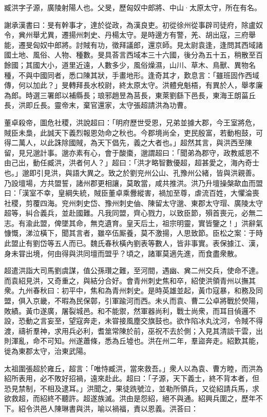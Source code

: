 
\begin{pinyinscope}
臧洪字子源，廣陵射陽人也。父旻，歷匈奴中郎將、中山·太原太守，所在有名。

謝承漢書曰：旻有幹事才，達於從政，為漢良吏。初從徐州從事辟司徒府，除盧奴令，兾州舉尤異，遷揚州刺史、丹楊太守。是時邊方有警，羌、胡出寇，三府舉能，遷旻匈奴中郎將。討賊有功，徵拜議郎，還京師。見太尉袁逢，逢問其西域諸國土地、風俗、人物、種數。旻具荅言西域本三十六國，後分為五十五，稍散至百餘國；其國大小，道里近遠，人數多少，風俗燥濕，山川、草木、鳥獸、異物名種，不與中國同者，悉口陳其狀，手畫地形。逢奇其才，歎息言：「雖班固作西域傳，何以加此？」旻轉拜長水校尉，終太原太守。洪體皃魁梧，有異於人，舉孝廉為郎。時選三署郎以補縣長；琅邪趙昱為莒長，東萊劉繇下邑長，東海王朗菑丘長，洪即丘長。靈帝末，棄官還家，太守張超請洪為功曹。

董卓殺帝，圖危社稷，洪說超曰：「明府歷世受恩，兄弟並據大郡，今王室將危，賊臣未梟，此誠天下義烈報恩効命之秋也。今郡境尚全，吏民殷富，若動枹鼓，可得二萬人，以此誅除國賊，為天下倡先，義之大者也。」超然其言，與洪西至陳留，見兄邈計事。邈亦素有心，會于酸棗，邈謂超曰：「聞弟為郡守，政教威恩不由己出，動任臧洪，洪者何人？」超曰：「洪才略智數優超，超甚愛之，海內奇士也。」邈即引見洪，與語大異之。致之於劉兖州公山、孔豫州公緒，皆與洪親善。乃設壇場，方共盟誓，諸州郡更相讓，莫敢當，咸共推洪。洪乃升壇操槃歃血而盟曰：「漢室不幸，皇綱失統，賊臣董卓乘釁縱害，禍加至尊，虐流百姓，大懼淪喪社稷，剪覆四海。兖州刺史岱、豫州刺史伷、陳留太守邈、東郡太守瑁、廣陵太守超等，糾合義兵，並赴國難。凡我同盟，齊心戮力，以致臣節，殞首喪元，必無二志。有渝此盟，俾墜其命，無克遺育。皇天后土，祖宗明靈，實皆鑒之！」洪辭氣慷慨，涕泣橫下，聞其言者，雖卒伍厮養，莫不激揚，人思致節。臣松之案：于時此盟止有劉岱等五人而已。魏氏春秋橫內劉表等數人，皆非事實。表保據江、漢，身未甞出境，何由得與洪同壇而盟乎？頃之，諸軍莫適先進，而食盡衆散。

超遣洪詣大司馬劉虞謀，值公孫瓚之難，至河間，遇幽、兾二州交兵，使命不達。而袁紹見洪，又奇重之，與結分合好。會青州刺史焦和卒，紹使洪領青州以撫其衆。九州春秋曰：初平中，焦和為青州刺史。是時英雄並起，黃巾寇暴，和務及同盟，俱入京畿，不暇為民保鄣，引軍踰河而西。未乆而袁、曹二公卓將戰於熒陽，敗績。黃巾遂廣，屠裂城邑。和不能禦，然軍器尚利，戰士尚衆，而耳目偵邏不設，恐動之言妄至，望寇奔走，未甞接風塵交旗鼓也。欲作陷冰丸沈河，令賊不得渡，禱祈羣神，求用兵必利，耆筮常陳於前，巫祝不去於側；入見其清談干雲，出則渾亂，命不可知。州遂蕭條，悉為丘墟也。洪在州二年，羣盜奔走。紹歎其能，徙為東郡太守，治東武陽。

太祖圍張超於雍丘，超言：「唯恃臧洪，當來救吾。」衆人以為袁、曹方睦，而洪為紹所表用，必不敗好招禍，遠來赴此。超曰：「子源，天下義士，終不背本者，但恐見禁制，不相及逮耳。」洪聞之，果徒跣號泣，並勒所領兵，又從紹請兵馬，求欲救超，而紹終不聽許。超遂族滅。洪由是怨紹，絕不與通。紹興兵圍之，歷年不下。紹令洪邑人陳琳書與洪，喻以禍福，責以恩義。洪荅曰：


\end{pinyinscope}
